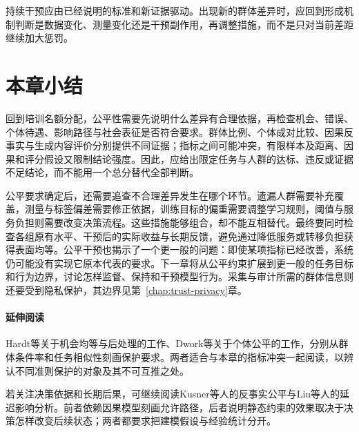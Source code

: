 持续干预应由已经说明的标准和新证据驱动。出现新的群体差异时，应回到形成机制判断是数据变化、测量变化还是干预副作用，再调整措施，而不是只对当前差距继续加大惩罚。

\section{本章小结}
\label{sec:fairness-summary}

回到培训名额分配，公平性需要先说明什么差异有合理依据，再检查机会、错误、个体待遇、影响路径与社会表征是否符合要求。群体比例、个体成对比较、因果反事实与生成内容评价分别提供不同证据；指标之间可能冲突，有限样本及距离、因果和评分假设又限制结论强度。因此，应给出限定任务与人群的达标、违反或证据不足结论，而不能用一个总分替代全部判断。

公平要求确定后，还需要追查不合理差异发生在哪个环节。遗漏人群需要补充覆盖，测量与标签偏差需要修正依据，训练目标的偏重需要调整学习规则，阈值与服务负担则需要改变决策流程。这些措施能够组合，却不能互相替代。最终要同时检查各组原有水平、干预后的实际收益与长期反馈，避免通过降低服务或转移负担获得表面均等。公平干预也揭示了一个更一般的问题：即使某项指标已经改善，系统仍可能没有实现它原本代表的要求。下一章将从公平约束扩展到更一般的任务目标和行为边界，讨论怎样监督、保持和干预模型行为。采集与审计所需的群体信息则还要受到隐私保护，其边界见第~\ref{chap:trust-privacy}章。

\paragraph{延伸阅读}

Hardt等关于机会均等与后处理的工作、Dwork等关于个体公平的工作，分别从群体条件率和任务相似性刻画保护要求。两者适合与本章的指标冲突一起阅读，以辨认不同准则保护的对象及其不可互推之处。

若关注决策依据和长期后果，可继续阅读Kusner等人的反事实公平与Liu等人的延迟影响分析。前者依赖因果模型刻画允许路径，后者说明静态约束的效果取决于决策怎样改变后续状态；两者都要求把建模假设与经验统计分开。
